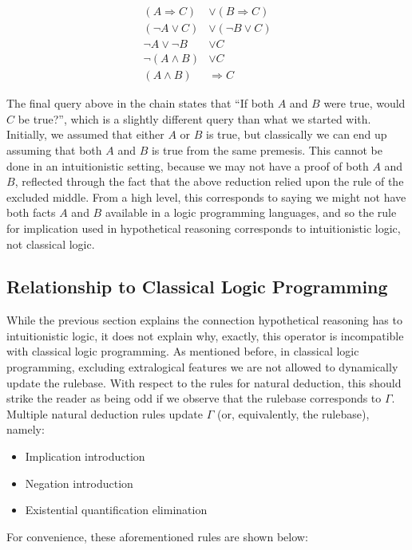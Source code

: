 \begin{center}
  \begin{align*}
    (A \Rightarrow C) &\lor (B \Rightarrow C)\\
    (\neg A \lor C) &\lor (\neg B \lor C)\\
    \neg A \lor \neg B &\lor C\\
    \neg(A \land B) &\lor C\\
    (A \land B) &\Rightarrow C
  \end{align*}
\end{center}

The final query above in the chain states that ``If both $A$ and $B$ were true, would $C$ be true?'', which is a slightly different query than what we started with.
Initially, we assumed that either $A$ or $B$ is true, but classically we can end up assuming that both $A$ and $B$ is true from the same premesis.
This cannot be done in an intuitionistic setting, because we may not have a proof of both $A$ and $B$, reflected through the fact that the above reduction relied upon the rule of the excluded middle.
From a high level, this corresponds to saying we might not have both facts $A$ and $B$ available in a logic programming languages, and so the rule for implication used in hypothetical reasoning corresponds to intuitionistic logic, not classical logic.

\subsection{Relationship to Classical Logic Programming}
While the previous section explains the connection hypothetical reasoning has to intuitionistic logic, it does not explain why, exactly, this operator is incompatible with classical logic programming.
As mentioned before, in classical logic programming, excluding extralogical features we are not allowed to dynamically update the rulebase.
With respect to the rules for natural deduction, this should strike the reader as being odd if we observe that the rulebase corresponds to $\Gamma$.
Multiple natural deduction rules update $\Gamma$ (or, equivalently, the rulebase), namely:
\begin{itemize}
  \item Implication introduction
  \item Negation introduction
  \item Existential quantification elimination
\end{itemize}

For convenience, these aforementioned rules are shown below:

